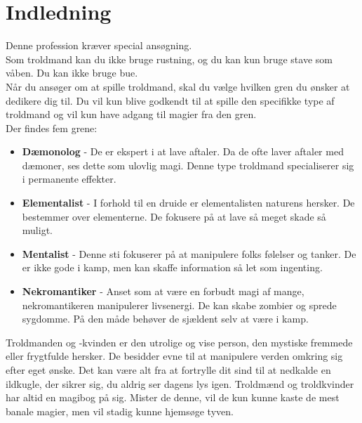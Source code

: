 \chapter*{Indledning}

Denne profession kræver special ansøgning.\\
Som troldmand kan du ikke bruge rustning, og du kan kun bruge stave som våben. Du kan ikke bruge bue.\\

Når du ansøger om at spille troldmand, skal du vælge hvilken gren du ønsker at dedikere dig til. Du vil kun blive godkendt til at spille den specifikke type af troldmand og vil kun have adgang til magier fra den gren.\\
Der findes fem grene:\\
\begin{itemize}
    \item \textbf{Dæmonolog} - De er ekspert i at lave aftaler. Da de ofte laver aftaler med dæmoner, ses dette som ulovlig magi. Denne type troldmand specialiserer sig i permanente effekter.
    \item \textbf{Elementalist} - I forhold til en druide er elementalisten naturens hersker. De bestemmer over elementerne. De fokusere på at lave så meget skade så muligt.
    \item \textbf{Mentalist} - Denne sti fokuserer på at manipulere folks følelser og tanker. De er ikke gode i kamp, men kan skaffe information så let som ingenting.
    \item \textbf{Nekromantiker} - Anset som at være en forbudt magi af mange, nekromantikeren manipulerer livsenergi. De kan skabe zombier og sprede sygdomme. På den måde behøver de sjældent selv at være i kamp.
\end{itemize}

Troldmanden og -kvinden er den utrolige og vise person, den mystiske fremmede eller frygtfulde
hersker. De besidder evne til at manipulere verden omkring sig efter eget ønske. Det kan være alt fra
at fortrylle dit sind til at nedkalde en ildkugle, der sikrer sig, du aldrig ser dagens lys igen. Troldmænd
og troldkvinder har altid en magibog på sig. Mister de denne, vil de kun kunne kaste de mest banale
magier, men vil stadig kunne hjemsøge tyven.

